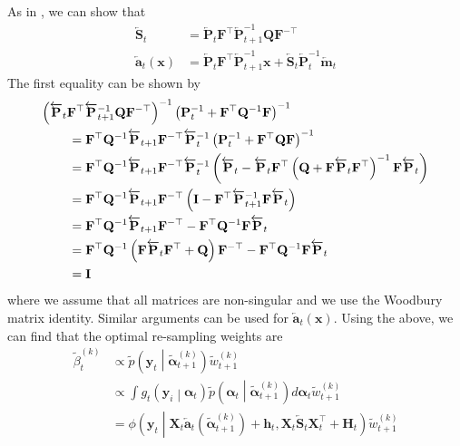 \documentclass[notitlepage]{article}
\renewcommand{\vec}[1]{\bm{#1}}
\newcommand{\vecLarrow}[1]{\overleftarrow{\vec{#1}}}
\newcommand{\mat}[1]{\mathbf{#1}}
\newcommand{\matLarrow}[1]{\overleftarrow{\mat{#1}}}
\newcommand{\Lparen}[1]{\left( #1\right)}
\newcommand{\Cond}[2]{ #1 \middle\vert  #2}
\newcommand{\optor}[2]{#1\Lparen{#2}}
\newcommand{\optorC}[3]{\optor{#1}{\Cond{#2}{#3}}}
\newcommand{\pdenstC}[2]{\optorC{\widetilde p}{#1}{#2}}
\newcommand{\normaldC}[3]{\optorC{\phi}{#1}{#2,#3}}
\newcommand{\particB}[3]{\widetilde{#1}_{#2}^{\Lparen{#3}}}
\begin{document}
As in \cite{fearnhead10}, we can show that %
%
\begin{align*}
	\matLarrow{S}_t &= \matLarrow{P}_t\mat{F}^\top\matLarrow{P}_{t + 1}^{-1}\mat{Q}\mat{F}^{-\top} \\
%
	\vecLarrow{a}_t(\vec x) &=
		\matLarrow{P}_t\mat{F}^\top\matLarrow{P}_{t + 1}^{-1}\vec x
		+ \matLarrow{S}_t\matLarrow{P}_t^{-1} \vecLarrow{m}_t
\end{align*}%
%
The first equality can be shown by%
%
\begin{align*}
\Lparen{\matLarrow{P}_t\mat{F}^\top\matLarrow{P}_{t + 1}^{-1}
	\mat{Q}\mat{F}^{-\top}}^{-1}
	\Lparen{\mat P^{-1}_t + \mat F^\top\mat Q^{-1}\mat F}^{-1}
	\hspace{-175pt}& \\
&= \mat F^\top \mat Q^{-1}\matLarrow{P}_{t + 1}
	\mat F^{-\top}\matLarrow{P}_t^{-1}
	\Lparen{\mat P^{-1}_t + \mat F^\top\mat Q\mat F}^{-1} \\
&= \mat F^\top \mat Q^{-1}\matLarrow{P}_{t + 1}
	\mat F^{-\top}\matLarrow{P}_t^{-1}
	\Lparen{\matLarrow{P}_t - \matLarrow{P}_t
		\mat F^\top\Lparen{\mat Q + \mat F \matLarrow{P}_t 
			\mat F^\top}^{-1}
		\mat{F}\matLarrow{P}_t} \\
&= \mat F^\top \mat Q^{-1}\matLarrow{P}_{t + 1}
	\mat F^{-\top}
	\Lparen{\mat I -
		\mat F^\top\matLarrow{P}_{t + 1}^{-1}
		\mat{F}\matLarrow{P}_t} \\
&= \mat F^\top \mat Q^{-1}\matLarrow{P}_{t + 1}
	\mat F^{-\top} - \mat F^\top \mat Q^{-1} \mat F \matLarrow{P}_t \\
&= \mat F^\top \mat Q^{-1}\Lparen{
		\mat F \matLarrow{P}_t \mat F^\top + \mat Q}
	\mat F^{-\top} - \mat F^\top \mat Q^{-1} \mat F \matLarrow{P}_t \\
&= \mat I
\end{align*}
%
where we assume that all matrices are non-singular and we use the Woodbury matrix identity.
 Similar arguments can be used for $\vecLarrow{a}_t(\vec x)$. Using the above, we can 
 find that the optimal re-sampling weights are%
%
\begin{align}\label{eq:bwReWeight}
\particB{\beta}{t}{k} &\propto %
		\pdenstC{\vec{y}_t}{\particB{\vec\alpha}{t + 1}k}
		\particB w{t + 1}k \\
&\propto \int \nonumber
	\optorC{g_t}{\vec y_i}{\vec\alpha_t}
	\pdenstC{\vec\alpha_t}{\particB{\vec\alpha}{t + 1}k}
	d\vec\alpha_t \particB w{t + 1}k \\
	&=\normaldC{\vec y_t }{
		\mat X_t \vecLarrow{a}_t(
		\particB{\vec\alpha}{t + 1}k) + \vec h_t}{%
	\mat X_t\matLarrow{S}_t\mat X_t^\top + \mat H_t}
	\particB w{t + 1}k\nonumber
\end{align}%
\end{document}
